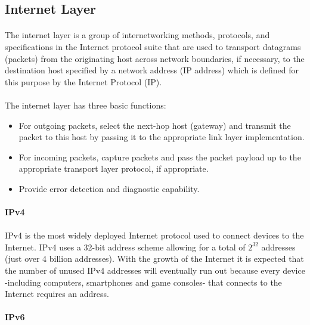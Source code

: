 \subsection{Internet Layer}
\paragraph{}
The internet layer is a group of internetworking methods, protocols, and specifications in the Internet protocol suite that are used to transport datagrams (packets) from the originating host across network boundaries, if necessary, to the destination host specified by a network address (IP address) which is defined for this purpose by the Internet Protocol (IP). 
\paragraph{}
The internet layer has three basic functions:
\begin{itemize}
\item For outgoing packets, select the next-hop host (gateway) and transmit the packet to this host by passing it to the appropriate link layer implementation.
\item For incoming packets, capture packets and pass the packet payload up to the appropriate transport layer protocol, if appropriate.
\item Provide error detection and diagnostic capability.
\end{itemize}

\paragraph{} \textbf{IPv4}
\paragraph{}
IPv4 is the most widely deployed Internet protocol used to connect devices to the Internet. IPv4 uses a 32-bit address scheme allowing for a total of $ 2^{32} $ addresses (just over 4 billion addresses).  With the growth of the Internet it is expected that the number of unused IPv4 addresses will eventually run out because every device -including computers, smartphones and game consoles- that connects to the Internet requires an address.

\paragraph{} \textbf{IPv6}
